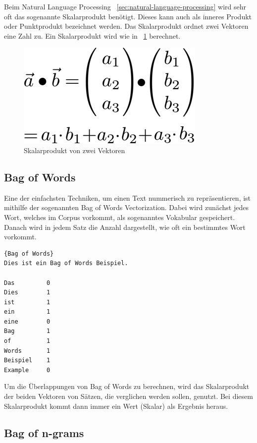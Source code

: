 Beim Natural Language Processing ~\ref{sec:natural-language-processing} wird sehr oft das sogenannte Skalarprodukt benötigt.
Dieses kann auch als inneres Produkt oder Punktprodukt bezeichnet werden.
Das Skalarprodukt ordnet zwei Vektoren eine Zahl zu.
Ein Skalarprodukt wird wie in ~\ref{fig:dot-product} berechnet.

\begin{figure}[hbt!]
    \centering
    \includegraphics[scale=0.5]{pics/dot-product}
    \caption{Skalarprodukt von zwei Vektoren~\cite{dotProduct}}
    \label{fig:dot-product}
\end{figure}

\subsection{Bag of Words}\label{subsec:bag-of-words}

Eine der einfachsten Techniken, um einen Text nummerisch zu repräsentieren, ist mithilfe der sogenannten Bag of Words Vectorization.
Dabei wird zunächst jedes Wort, welches im Corpus vorkommt, als sogenanntes Vokabular gespeichert.
Danach wird in jedem Satz die Anzahl dargestellt, wie oft ein bestimmtes Wort vorkommt.\cite{textAnalysisMonkeylearn}

\begin{lstlisting}[label={lst:bag-of-word},caption={Bag of Words}]{Bag of Words}
Dies ist ein Bag of Words Beispiel.

Das         0
Dies        1
ist         1
ein         1
eine        0
Bag         1
of          1
Words       1
Beispiel    1
Example     0
\end{lstlisting}

Um die Überlappungen von Bag of Words zu berechnen, wird das Skalarprodukt der beiden Vektoren von Sätzen, die verglichen werden sollen, genutzt.
Bei diesem Skalarprodukt kommt dann immer ein Wert (Skalar) als Ergebnis heraus.


\subsection{Bag of n-grams}\label{subsec:bag-of-ngrams}

